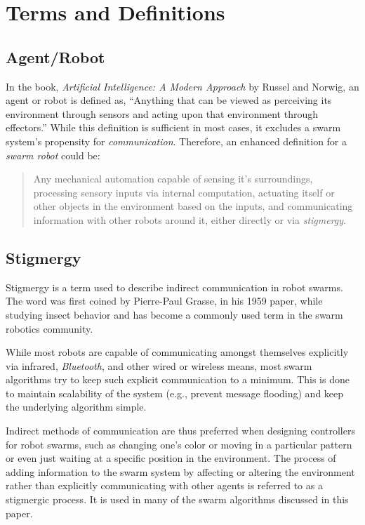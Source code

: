 \documentclass[Main.tex]{subfiles}
\begin{document}
\section{Terms and Definitions}
\subsection{Agent/Robot}
In the book, \emph{Artificial Intelligence: A Modern Approach} by Russel and Norwig\citep{Russel1995}, an agent or robot is defined as, ``Anything that can be viewed as perceiving its environment through sensors and acting upon that environment through effectors.'' While this definition is sufficient in most cases, it excludes a swarm system's propensity for \emph{communication}. Therefore, an enhanced definition for a \emph{swarm robot} could be: 
\begin{quote}
Any mechanical automation capable of sensing it's surroundings, processing sensory inputs via internal computation, actuating itself or other objects in the environment based on the inputs, and communicating information with other robots around it, either directly or via \emph{stigmergy}.
\end{quote}


\subsection{Stigmergy}
Stigmergy is a term used to describe indirect communication in robot swarms. The word was first coined by Pierre-Paul Grasse, in his 1959 paper\citep{Grasse1959}, while studying insect behavior and has become a commonly used term in the swarm robotics community. 

While most robots are capable of communicating amongst themselves explicitly via infrared, \emph{Bluetooth}\texttrademark, and other wired or wireless means, most swarm algorithms try to keep such explicit communication to a minimum. This is done to maintain scalability of the system (e.g., prevent message flooding) and keep the underlying algorithm simple.

Indirect methods of communication are thus preferred when designing controllers for robot swarms, such as changing one's color or moving in a particular pattern or even just waiting at a specific position in the environment. The process of adding information to the swarm system by affecting or altering the environment rather than explicitly communicating with other agents is referred to as a stigmergic process\citep{Balch2005}. It is used in many of the swarm algorithms discussed in this paper.
\end{document}
